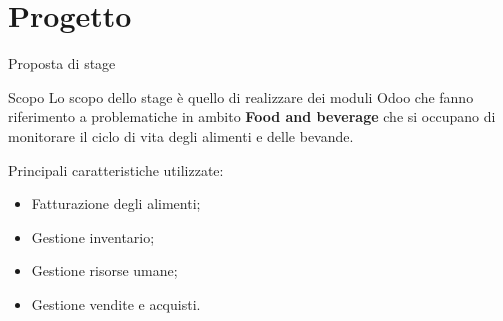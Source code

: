 \documentclass{beamer}
\begin{document}
\section{Progetto}
\begin{frame}{Proposta di stage}
	\begin{alertblock}{Scopo}
		Lo scopo dello stage \`e  quello di realizzare dei moduli Odoo che fanno riferimento a problematiche in ambito \textbf{Food and beverage} che si occupano di monitorare il ciclo di vita degli alimenti e delle bevande.
	\end{alertblock}
	Principali caratteristiche utilizzate:
	\begin{itemize}
		\item Fatturazione degli alimenti;
		\item Gestione inventario;
		\item Gestione risorse umane;
		\item Gestione vendite e acquisti.
	\end{itemize}
\end{frame}

\end{document}
